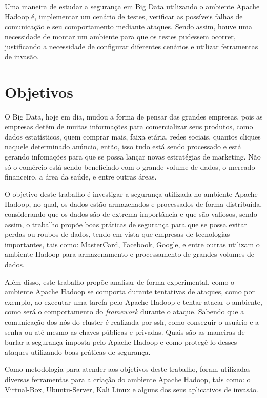 Uma maneira de estudar a segurança em Big Data utilizando o ambiente Apache Hadoop é, implementar um cenário de testes, verificar as possíveis falhas de comunicação e seu comportamento mediante ataques. Sendo assim, houve uma necessidade de montar um ambiente para que os testes pudessem ocorrer, justificando a necessidade de configurar diferentes cenários e utilizar ferramentas de invasão.

\section{Objetivos}

O Big Data, hoje em dia, mudou a forma de pensar das grandes empresas, pois as empresas detêm de muitas informações para comercializar seus produtos, como dados estatísticos, quem comprar mais, faixa etária, redes sociais, quantos cliques naquele determinado anúncio, então, isso tudo está sendo processado e está gerando infomações para que se possa lançar novas estratégias de marketing. Não só o comércio está sendo beneficiado com o grande volume de dados, o mercado financeiro, a área da saúde, e entre outras áreas.

O objetivo deste trabalho é investigar a segurança utilizada no ambiente Apache Hadoop, no qual, os dados estão armazenados e processados de forma distribuída, considerando que os dados são de extrema importância e que são valiosos, sendo assim, o trabalho propõe boas práticas de segurança para que se possa evitar perdas ou roubos de dados, tendo em vista que empresas de tecnologias importantes, tais como: MasterCard, Facebook, Google, e entre outras utilizam o ambiente Hadoop para armazenamento e processamento de grandes volumes de dados.

Além disso, este trabalho propõe analisar de forma experimental, como o ambiente Apache Hadoop se comporta durante tentativas de ataques, como por exemplo, ao executar uma tarefa pelo Apache Hadoop e tentar atacar o ambiente, como será o comportamento do \textit{framework} durante o ataque. Sabendo que a comunicação dos nós do cluster é realizada por ssh, como conseguir o usuário e a senha ou até mesmo as chaves públicas e privadas. Quais são as maneiras de burlar a segurança imposta pelo Apache Hadoop e como protegê-lo desses ataques utilizando boas práticas de segurança.

Como metodologia para atender aos objetivos deste trabalho, foram utilizadas diversas ferramentas para a criação do ambiente Apache Hadoop, tais como: o Virtual-Box, Ubuntu-Server, Kali Linux e alguns dos seus aplicativos de invasão.


